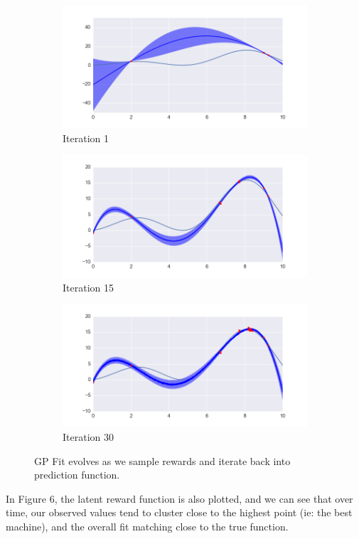 \documentclass{article}
\begin{document}
\begin{figure}
\centering
\begin{subfigure}{.5\textwidth}
  \centering
  \includegraphics[width=.8\linewidth]{gp_plot1.png}
  \caption{Iteration 1}
  \label{fig:sub1}
\end{subfigure}%
\begin{subfigure}{.5\textwidth}
  \centering
  \includegraphics[width=.8\linewidth]{gp_plot2.png}
  \caption{Iteration 15}
  \label{fig:sub2}
\end{subfigure}
\begin{subfigure}{.5\textwidth}
  \centering
  \includegraphics[width=.8\linewidth]{gp_plot3.png}
  \caption{Iteration 30}
  \label{fig:sub3}
\end{subfigure}
\caption{GP Fit evolves as we sample rewards and iterate back into prediction function. }
\label{fig:test}
\end{figure}

In Figure 6, the latent reward function is also plotted, and we can see that over time, our observed values tend to cluster close to the highest point (ie: the best machine), and the overall fit matching close to the true function.
\end{document}

